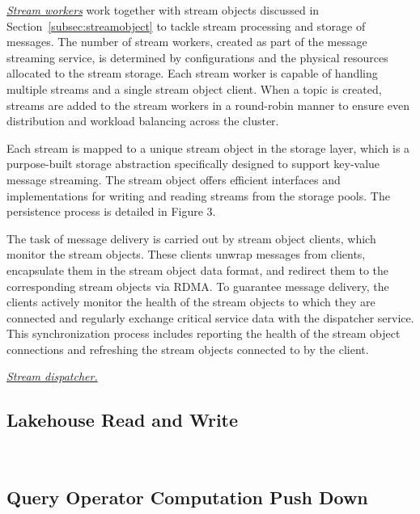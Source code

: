 \noindent\underline{\textit{Stream workers}} work together with stream objects discussed in Section~\ref{subsec:streamobject} to tackle stream processing and storage of messages. The number of stream workers, created as part of the message streaming service, is determined by configurations and the physical resources allocated to the stream storage. Each stream worker is capable of handling multiple streams and a single stream object client. When a topic is created, streams are added to the stream workers in a round-robin manner to ensure even distribution and workload balancing across the cluster.

Each stream is mapped to a unique stream object in the storage layer, which is a purpose-built storage abstraction specifically designed to support key-value message streaming. The stream object offers efficient interfaces and implementations for writing and reading streams from the storage pools. The persistence process is detailed in Figure 3.

The task of message delivery is carried out by stream object clients, which monitor the stream objects. These clients unwrap messages from clients, encapsulate them in the stream object data format, and redirect them to the corresponding stream objects via RDMA. To guarantee message delivery, the clients actively monitor the health of the stream objects to which they are connected and regularly exchange critical service data with the dispatcher service. This synchronization process includes reporting the health of the stream object connections and refreshing the stream objects connected to by the client.


\noindent\underline{\textit{Stream dispatcher.}} 


\subsection{Lakehouse Read and Write}~\label{subsec:lakehouse}


\subsection{Query Operator Computation Push Down}~\label{subsec:pushdown}